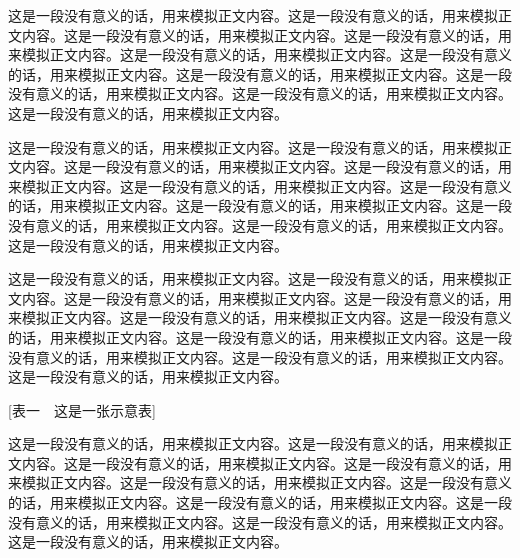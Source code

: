 这是一段没有意义的话，用来模拟正文内容。这是一段没有意义的话，用来模拟正文内容。这是一段没有意义的话，用来模拟正文内容。这是一段没有意义的话，用来模拟正文内容。这是一段没有意义的话，用来模拟正文内容。这是一段没有意义的话，用来模拟正文内容。这是一段没有意义的话，用来模拟正文内容。这是一段没有意义的话，用来模拟正文内容。这是一段没有意义的话，用来模拟正文内容。这是一段没有意义的话，用来模拟正文内容。

\todo{}

这是一段没有意义的话，用来模拟正文内容。这是一段没有意义的话，用来模拟正文内容。这是一段没有意义的话，用来模拟正文内容。这是一段没有意义的话，用来模拟正文内容。这是一段没有意义的话，用来模拟正文内容。这是一段没有意义的话，用来模拟正文内容。这是一段没有意义的话，用来模拟正文内容。这是一段没有意义的话，用来模拟正文内容。这是一段没有意义的话，用来模拟正文内容。这是一段没有意义的话，用来模拟正文内容。

这是一段没有意义的话，用来模拟正文内容。这是一段没有意义的话，用来模拟正文内容。这是一段没有意义的话，用来模拟正文内容。这是一段没有意义的话，用来模拟正文内容。这是一段没有意义的话，用来模拟正文内容。这是一段没有意义的话，用来模拟正文内容。这是一段没有意义的话，用来模拟正文内容。这是一段没有意义的话，用来模拟正文内容。这是一段没有意义的话，用来模拟正文内容。这是一段没有意义的话，用来模拟正文内容。

[表一　这是一张示意表]

这是一段没有意义的话，用来模拟正文内容。这是一段没有意义的话，用来模拟正文内容。这是一段没有意义的话，用来模拟正文内容。这是一段没有意义的话，用来模拟正文内容。这是一段没有意义的话，用来模拟正文内容。这是一段没有意义的话，用来模拟正文内容。这是一段没有意义的话，用来模拟正文内容。这是一段没有意义的话，用来模拟正文内容。这是一段没有意义的话，用来模拟正文内容。这是一段没有意义的话，用来模拟正文内容。

